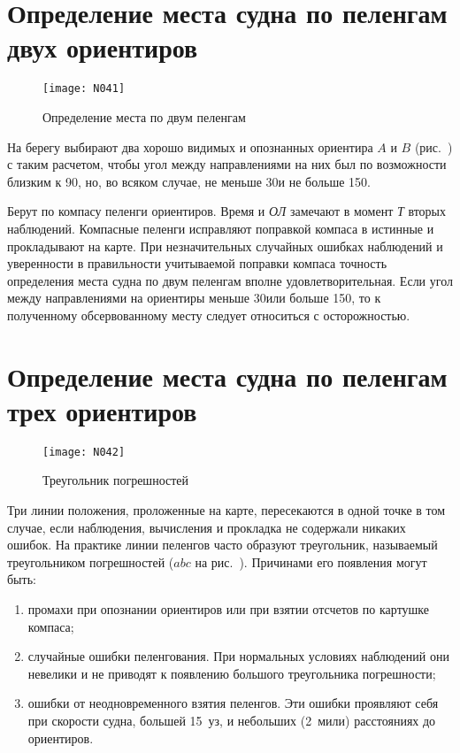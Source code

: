 \section{Определение места судна по пеленгам двух ориентиров}

\begin{figure}[htb]
  \centering{}
  \texttt{[image: N041]}
  \caption{Определение места по двум пеленгам}
  \label{fig:N41}
\end{figure}

На берегу выбирают два хорошо видимых и опознанных ориентира $A$ и $B$ (рис.~) с таким расчетом, чтобы угол между направлениями на них был по возможности близким к 90\gr, но, во всяком случае, не меньше 30\gr и не больше 150\gr. 

Берут по компасу пеленги ориентиров. Время и \textit{ОЛ} замечают в момент \textit{Т} вторых наблюдений. Компасные пеленги исправляют поправкой компаса в истинные и прокладывают на карте. При незначительных случайных ошибках наблюдений и уверенности в правильности учитываемой поправки компаса точность определения места судна по двум пеленгам вполне удовлетворительная. Если угол между направлениями на ориентиры меньше 30\gr или больше 150\gr, то к полученному обсервованному месту следует относиться с осторожностью. 

\section{Определение места судна по пеленгам трех ориентиров}

\begin{figure}[htb]
  \centering{}
  \texttt{[image: N042]}
  \caption{Треугольник погрешностей}
  \label{fig:N42}
\end{figure}

Три линии положения, проложенные на карте, пересекаются в одной точке в том случае, если наблюдения, вычисления и прокладка не содержали никаких ошибок. На практике линии пеленгов часто образуют треугольник, называемый треугольником погрешностей ($abc$ на рис.~). Причинами его появления могут быть: 

\begin{enumerate}
\item промахи при опознании ориентиров или при взятии отсчетов по картушке компаса; 
\item случайные ошибки пеленгования. При нормальных условиях наблюдений они невелики и не приводят к появлению большого треугольника погрешности; 
\item ошибки от неодновременного взятия пеленгов. Эти ошибки проявляют себя при скорости судна, большей 15~уз, и небольших (2~мили) расстояниях до ориентиров. 
\end{enumerate}


